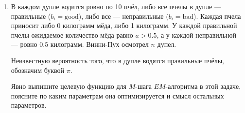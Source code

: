\documentclass[12pt]{article}
\begin{document}
\begin{enumerate}
\item 
В каждом дупле водится ровно по 10 пчёл, либо все пчелы в дупле — правильные ($b_i = \text{good}$), 
либо все — неправильные ($b_i = \text{bad}$). 
Каждая пчела приносит либо 0 килограмм мёда, либо 1 килограмм. 
У каждой правильной пчелы ожидаемое количество мёда равно $a>0.5$, а у каждой неправильной — ровно $0.5$ килограмм. 
Винни-Пух осмотрел $n$ дупел. 

Неизвестную вероятность того, что в дупле водятся правильные пчёлы, обозначим буквой $\pi$. 

Явно выпишите целевую функцию для $M$-шага $EM$-алгоритма в этой задаче, 
поясните по каким параметрам она оптимизируется и смысл остальных параметров.

\end{enumerate}
\end{document}
